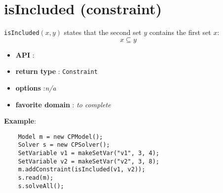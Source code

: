 \label{isincluded}
\hypertarget{isincluded}{}

\section{isIncluded (constraint)}\label{isincluded:isincludedconstraint}\hypertarget{isincluded:isincludedconstraint}{}
\begin{notedef}
  \texttt{isIncluded}$(x,y)$ states that the second set $y$ contains the first set $x$:
 $$x\subseteq y$$
\end{notedef}

\begin{itemize}
	\item \textbf{API} : 
	\item \textbf{return type} : \texttt{Constraint}
	\item \textbf{options} :\emph{n/a}
	\item \textbf{favorite domain} : \emph{to complete}
\end{itemize}

\textbf{Example}:
\begin{lstlisting}
	Model m = new CPModel();
	Solver s = new CPSolver();
	SetVariable v1 = makeSetVar("v1", 3, 4);
	SetVariable v2 = makeSetVar("v2", 3, 8);
	m.addConstraint(isIncluded(v1, v2));
	s.read(m);
	s.solveAll();
\end{lstlisting} 
